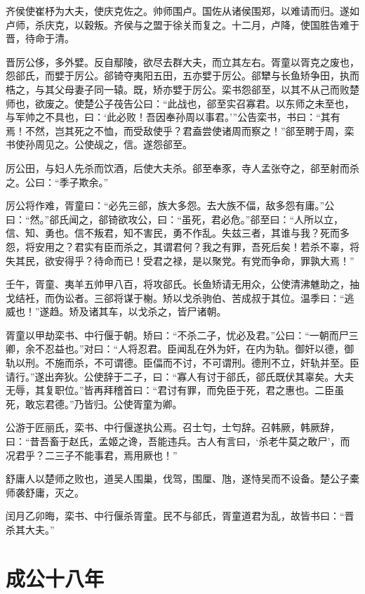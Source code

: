 \documentclass[a4paper,12pt,UTF8,twoside]{ctexbook}
\begin{document}
齐侯使崔杼为大夫，使庆克佐之。帅师围卢。国佐从诸侯围郑，以难请而归。遂如卢师，杀庆克，以穀叛。齐侯与之盟于徐关而复之。十二月，卢降，使国胜告难于晋，待命于清。

晋厉公侈，多外嬖。反自鄢陵，欲尽去群大夫，而立其左右。胥童以胥克之废也，怨郤氏，而嬖于厉公。郤锜夺夷阳五田，五亦嬖于厉公。郤犫与长鱼矫争田，执而梏之，与其父母妻子同一辕。既，矫亦嬖于厉公。栾书怨郤至，以其不从己而败楚师也，欲废之。使楚公子茷告公曰：“此战也，郤至实召寡君。以东师之未至也，与军帅之不具也，曰：‘此必败！吾因奉孙周以事君。’”公告栾书，书曰：“其有焉！不然，岂其死之不恤，而受敌使乎？君盍尝使诸周而察之！”郤至聘于周，栾书使孙周见之。公使觇之，信。遂怨郤至。

厉公田，与妇人先杀而饮酒，后使大夫杀。郤至奉豕，寺人孟张夺之，郤至射而杀之。公曰：“季子欺余。”

厉公将作难，胥童曰：“必先三郤，族大多怨。去大族不偪，敌多怨有庸。”公曰：“然。”郤氏闻之，郤锜欲攻公，曰：“虽死，君必危。”郤至曰：“人所以立，信、知、勇也。信不叛君，知不害民，勇不作乱。失兹三者，其谁与我？死而多怨，将安用之？君实有臣而杀之，其谓君何？我之有罪，吾死后矣！若杀不辜，将失其民，欲安得乎？待命而已！受君之禄，是以聚党。有党而争命，罪孰大焉！”

壬午，胥童、夷羊五帅甲八百，将攻郤氏。长鱼矫请无用众，公使清沸魋助之，抽戈结衽，而伪讼者。三郤将谋于榭。矫以戈杀驹伯、苦成叔于其位。温季曰：“逃威也！”遂趋。矫及诸其车，以戈杀之，皆尸诸朝。

胥童以甲劫栾书、中行偃于朝。矫曰：“不杀二子，忧必及君。”公曰：“一朝而尸三卿，余不忍益也。”对曰：“人将忍君。臣闻乱在外为奸，在内为轨。御奸以德，御轨以刑。不施而杀，不可谓德。臣偪而不讨，不可谓刑。德刑不立，奸轨并至。臣请行。”遂出奔狄。公使辞于二子，曰：“寡人有讨于郤氏，郤氏既伏其辜矣。大夫无辱，其复职位。”皆再拜稽首曰：“君讨有罪，而免臣于死，君之惠也。二臣虽死，敢忘君德。”乃皆归。公使胥童为卿。

公游于匠丽氏，栾书、中行偃遂执公焉。召士匄，士匄辞。召韩厥，韩厥辞，曰：“昔吾畜于赵氏，孟姬之谗，吾能违兵。古人有言曰，‘杀老牛莫之敢尸’，而况君乎？二三子不能事君，焉用厥也！”

舒庸人以楚师之败也，道吴人围巢，伐驾，围厘、虺，遂恃吴而不设备。楚公子橐师袭舒庸，灭之。

闰月乙卯晦，栾书、中行偃杀胥童。民不与郤氏，胥童道君为乱，故皆书曰：“晋杀其大夫。”




\section{成公十八年}
\end{document}
